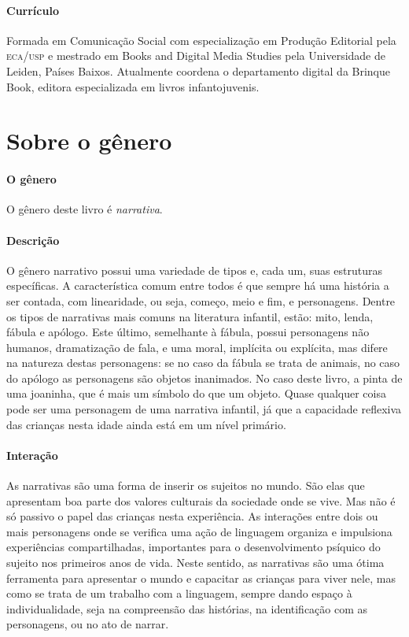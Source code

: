 \documentclass[11pt]{extarticle}
\begin{document}
\paragraph{Currículo} 
Formada em Comunicação Social com 
especialização em Produção Editorial pela \textsc{eca/usp} 
e mestrado em Books and Digital Media Studies pela 
Universidade de Leiden, Países Baixos.
Atualmente coordena o departamento digital da Brinque 
Book, editora especializada em livros infantojuvenis.
 


\section{Sobre o gênero}

\paragraph{O gênero} O gênero deste livro é \textit{narrativa}. 

\paragraph{Descrição} 
O gênero narrativo possui uma variedade de tipos e, cada um, suas estruturas específicas.
A característica comum entre todos é que sempre há uma história a ser contada, com linearidade,
ou seja, começo, meio e fim, e personagens. 
Dentre os tipos de narrativas mais comuns na literatura infantil, estão: mito, lenda, 
fábula e apólogo. Este último, semelhante à fábula, possui personagens não humanos, 
dramatização de fala, e uma moral, implícita ou explícita, mas difere na natureza destas 
personagens: se no caso da fábula se trata de animais, no caso do apólogo as personagens 
são objetos inanimados. No caso deste livro, a pinta de uma joaninha, que é mais um 
símbolo do que um objeto. Quase qualquer coisa pode ser uma personagem de uma narrativa 
infantil, já que a capacidade reflexiva das crianças nesta idade ainda está em um nível primário. 


\paragraph{Interação} 
As narrativas são uma forma de inserir os sujeitos no mundo. 
São elas que apresentam boa parte dos valores culturais da sociedade 
onde se vive. Mas não é só passivo o papel das crianças nesta experiência. 
As interações entre dois ou mais personagens onde se verifica
uma ação de linguagem organiza e impulsiona experiências compartilhadas,
importantes para o desenvolvimento psíquico do sujeito nos primeiros anos de vida.
Neste sentido, as narrativas são uma ótima ferramenta para
apresentar o mundo e capacitar as crianças para viver nele, mas como se
trata de um trabalho com a linguagem, sempre dando espaço à individualidade, 
seja na compreensão das histórias, na identificação com as personagens, ou 
no ato de narrar. 
\end{document}
